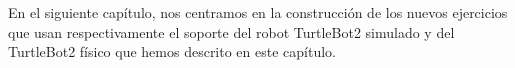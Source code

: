 En el siguiente capítulo, nos centramos en la construcción de los nuevos ejercicios que usan respectivamente el soporte del robot TurtleBot2 simulado y del TurtleBot2 físico que hemos descrito en este capítulo.




